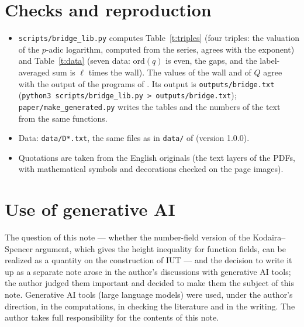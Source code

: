 \documentclass[11pt,a4paper]{article}
\numberwithin{table}{section}
\theoremstyle{plain}
\theoremstyle{definition}
\begin{document}
\section{Checks and reproduction}
\begin{itemize}
\item \texttt{scripts/bridge\_lib.py} computes Table~\ref{t:triples} (four triples: the valuation of the $p$-adic
logarithm, computed from the series, agrees with the exponent) and Table~\ref{t:data} (seven data: $\mathrm{ord}(q)$ is
even, the gaps, and the label-averaged sum is $\ell$ times the wall). The values of the wall and of $Q$ agree with the
output of the programs of \cite{TC}. Its output is \texttt{outputs/bridge.txt}
(\texttt{python3 scripts/bridge\_lib.py > outputs/bridge.txt}); \texttt{paper/make\_generated.py} writes the tables and
the numbers of the text from the same functions.
\item Data: \texttt{data/D*.txt}, the same files as in \texttt{data/} of \cite{TC} (version 1.0.0).
\item Quotations are taken from the English originals (the text layers of the PDFs, with mathematical symbols and
decorations checked on the page images).
\end{itemize}

\section*{Use of generative AI}
The question of this note --- whether the number-field version of the Kodaira--Spencer argument, which gives the
height inequality for function fields, can be realized as a quantity on the construction of IUT --- and the decision to
write it up as a separate note arose in the author's discussions with generative AI tools; the author judged them
important and decided to make them the subject of this note. Generative AI tools (large language models) were used,
under the author's direction, in the computations, in checking the literature and in the writing. The author takes full
responsibility for the contents of this note.
\end{document}
